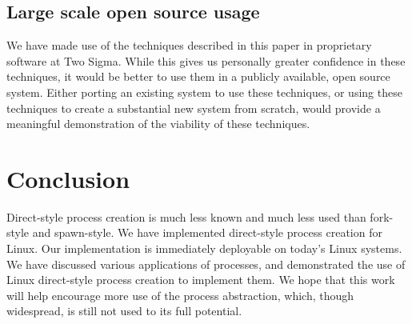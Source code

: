 \documentclass{acmart}
\begin{document}
\subsection{Large scale open source usage}
We have made use of the techniques described in this paper
in proprietary software at Two Sigma.
While this gives us personally greater confidence in these techniques,
it would be better to use them in a publicly available, open source system.
Either porting an existing system to use these techniques,
or using these techniques to create a substantial new system from scratch,
would provide a meaningful demonstration of the viability of these techniques.
\section{Conclusion}\label{conclusion}
Direct-style process creation is much less known and much less used than fork-style and spawn-style.
We have implemented direct-style process creation for Linux.
Our implementation is immediately deployable on today's Linux systems.
We have discussed various applications of processes,
and demonstrated the use of Linux direct-style process creation
to implement them.
We hope that this work will help encourage more use of the process abstraction,
which, though widespread,
is still not used to its full potential.



\end{document}
